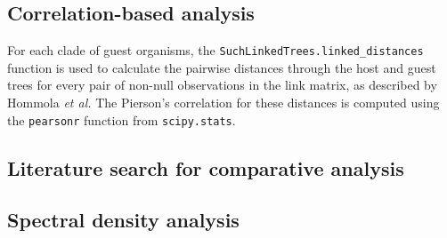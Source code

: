 \subsection{Correlation-based analysis}

For each clade of guest organisms, the {\tt SuchLinkedTrees.linked\_distances} function is used to calculate the pairwise distances through the host and guest trees for every pair of non-null observations in the link matrix, as described by Hommola {\em et al.} \cite{hommola2009permutation} The Pierson's correlation for these distances is computed using the {\tt pearsonr} function from {\tt scipy.stats}.

\subsection{Literature search for comparative analysis}

\subsection{Spectral density analysis}